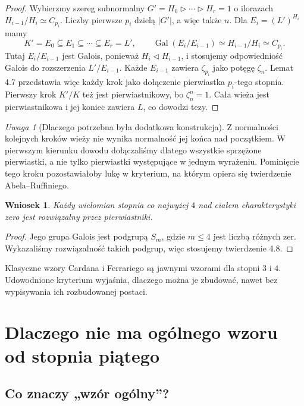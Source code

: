 \documentclass[11pt,a4paper,oneside]{book}
\numberwithin{equation}{section}
\theoremstyle{plain}
\newtheorem{wniosek}[twierdzenie]{Wniosek}
\theoremstyle{definition}
\theoremstyle{remark}
\newtheorem{uwaga}[twierdzenie]{Uwaga}
\newcommand{\Gal}{\operatorname{Gal}}
\begin{document}
\begin{proof}
Wybierzmy szereg subnormalny $G'=H_0\triangleright\cdots\triangleright H_r=1$ o ilorazach $H_{i-1}/H_i\simeq C_{p_i}$. Liczby pierwsze $p_i$ dzielą $|G'|$, a więc także $n$. Dla $E_i=(L')^{H_i}$ mamy
\[
K'=E_0\subseteq E_1\subseteq\cdots\subseteq E_r=L',
\qquad \Gal(E_i/E_{i-1})\simeq H_{i-1}/H_i\simeq C_{p_i}.
\]
Tutaj $E_i/E_{i-1}$ jest Galois, ponieważ $H_i\triangleleft H_{i-1}$, i stosujemy odpowiedniość Galois do rozszerzenia $L'/E_{i-1}$.
Każde $E_{i-1}$ zawiera $\zeta_{p_i}$ jako potęgę $\zeta_n$. Lemat 4.7 przedstawia więc każdy krok jako dołączenie pierwiastka $p_i$-tego stopnia. Pierwszy krok $K'/K$ też jest pierwiastnikowy, bo $\zeta_n^n=1$. Cała wieża jest pierwiastnikowa i jej koniec zawiera $L$, co dowodzi tezy.
\end{proof}

\begin{uwaga}[Dlaczego potrzebna była dodatkowa konstrukcja]
Z normalności kolejnych kroków wieży nie wynika normalność jej końca nad początkiem. W pierwszym kierunku dowodu dołączaliśmy dlatego wszystkie sprzężone pierwiastki, a nie tylko pierwiastki występujące w jednym wyrażeniu. Pominięcie tego kroku pozostawiałoby lukę w kryterium, na którym opiera się twierdzenie Abela--Ruffiniego.
\end{uwaga}

\begin{wniosek}
Każdy wielomian stopnia co najwyżej $4$ nad ciałem charakterystyki zero jest rozwiązalny przez pierwiastniki.
\end{wniosek}
\begin{proof}
Jego grupa Galois jest podgrupą $S_m$, gdzie $m\le4$ jest liczbą różnych zer. Wykazaliśmy rozwiązalność takich podgrup, więc stosujemy twierdzenie 4.8.
\end{proof}

Klasyczne wzory Cardana i Ferrariego są jawnymi wzorami dla stopni $3$ i $4$. Udowodnione kryterium wyjaśnia, dlaczego można je zbudować, nawet bez wypisywania ich rozbudowanej postaci.


\chapter{Dlaczego nie ma ogólnego wzoru od stopnia piątego}

\section{Co znaczy „wzór ogólny”?}
\end{document}
